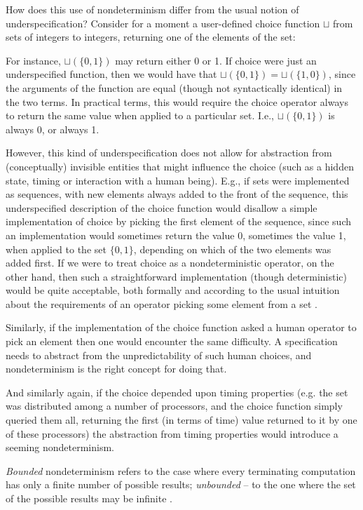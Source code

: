  How does this use of nondeterminism differ 
from the usual notion of under\-specifica\-tion? Consider for a 
moment a user-defined choice function $\sqcup$ from sets of 
integers to integers, returning one of the elements of the set:

 For instance, $\sqcup(\{0,1\})$ may return 
either 0 or 1. If choice were just an under\-specified 
function, then we would have that $\sqcup(\{0,1\})=\sqcup(\{1,0\})$, 
since the arguments of the function are equal (though not 
syntactically identical) in the two terms. In practical terms, this 
would require the choice operator always to return the same value 
when applied to a particular set. I.e., $\sqcup(\{0,1\})$ is always 0, or always 1.

 However, this kind of underspecification does 
not allow for abstraction from (conceptually) invisible entities that 
might influence the choice (such as a hidden state, timing or 
interaction with a human being). E.g., if sets were implemented 
as sequences, with new elements always added to the 
front of the sequence, this underspecified description of the choice function would disallow a 
simple imple\-men\-tation of choice by picking the first element 
of the sequence, since 
such an implementation would sometimes return the value 0, sometimes 
the value 1, when applied to the set $\{0,1\}$, depending on which of the 
two elements was added first. If we were to treat choice 
as a nondeterministic operator, on the other hand, then such a 
straightforward implementation (though deterministic) would be quite 
acceptable, both formally and according to the usual intuition 
about the requirements of an operator picking some element 
from a set \cite{c:107, c:132}.

 Similarly, if the implementation of the choice 
function asked a human operator to pick an element then one would 
encounter the same difficulty.
A specification needs to abstract from the unpredictability of such human choices, and 
nondeterminism is the right concept for doing that.

 And similarly again, if the choice depended 
upon timing properties (e.g. the set was distributed among a number of processors, and the choice function simply 
queried them all, returning the first (in terms of time) value 
returned to it by one of these processors) the abstraction from timing properties would introduce a seeming 
nondeterminism.

 {\em Bounded} nondeterminism refers 
to the case where every terminating computation has only a finite 
number of possible results; {\em unbounded}  -- to the one where 
the set of the possible results may be infinite \cite{c:Hes,c:54}.

